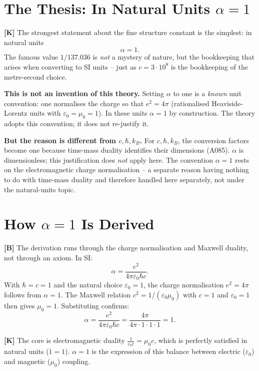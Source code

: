 \section{The Thesis: In Natural Units $\alpha = 1$}

\textbf{[K]} The strongest statement about the fine structure constant is the
simplest: in natural units
\[
  \alpha = 1 .
\]
The famous value $1/137{.}036$ is \emph{not} a mystery of nature, but the
bookkeeping that arises when converting to SI units -- just as
$c = 3\cdot10^8$ is the bookkeeping of the metre-second choice.

\textbf{This is not an invention of this theory.} Setting $\alpha$ to one is a
\emph{known} unit convention: one normalises the charge so that
$e^2 = 4\pi$ (rationalised Heaviside-Lorentz units with
$\varepsilon_0 = \mu_0 = 1$). In these units $\alpha = 1$ by construction.
The theory adopts this convention; it does not re-justify it.

\textbf{But the reason is different from $c, \hbar, k_B$.} For
$c, \hbar, k_B$, the conversion factors become one because time-mass duality
identifies their dimensions (A085). $\alpha$ is dimensionless; this justification
does \emph{not} apply here. The convention $\alpha = 1$ rests on the
electromagnetic charge normalisation -- a separate reason having nothing to do
with time-mass duality and therefore handled here separately, not under the
natural-units topic.

\section{How $\alpha = 1$ Is Derived}

\textbf{[B]} The derivation runs through the charge normalisation and
Maxwell duality, not through an axiom. In SI:
\[
  \alpha = \frac{e^2}{4\pi\varepsilon_0\hbar c}.
\]
With $\hbar = c = 1$ and the natural choice $\varepsilon_0 = 1$, the charge
normalisation $e^2 = 4\pi$ follows from $\alpha = 1$. The Maxwell relation
$c^2 = 1/(\varepsilon_0\mu_0)$ with $c = 1$ and $\varepsilon_0 = 1$ then gives
$\mu_0 = 1$. Substituting confirms:
\[
  \alpha = \frac{e^2}{4\pi\varepsilon_0\hbar c} = \frac{4\pi}{4\pi\cdot1\cdot1\cdot1} = 1 .
\]

\textbf{[K]} The core is electromagnetic duality
$\tfrac{1}{\varepsilon_0 c} = \mu_0 c$, which is perfectly satisfied in natural
units ($1 = 1$). $\alpha = 1$ is the expression of this balance between
electric ($\varepsilon_0$) and magnetic ($\mu_0$) coupling.

